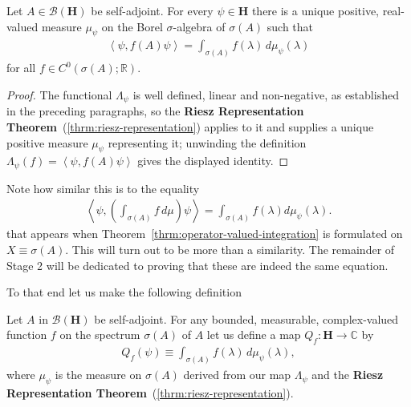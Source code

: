 \begin{proposition}
    \label{prpstn:associated-measures-self-adjoint}
    \leanok
    Let $A \in \mathcal{B}(\mathbf{H})$ be self-adjoint. For every $\psi \in \mathbf{H}$ there is a unique positive, real-valued measure $\mu_\psi$ on the Borel $\sigma$-algebra of $\sigma(A)$ such that
    \begin{align}
        \left< \psi, f(A) \psi \right> = \int_{\sigma(A)} f(\lambda) \, d\mu_\psi(\lambda)
    \end{align}
    for all $f \in C^0(\sigma(A) ; \mathbb{R})$.
\end{proposition}
\begin{proof}
    \leanok
The functional $\Lambda_\psi$ is well defined, linear and non-negative, as established in the preceding paragraphs, so the \textbf{Riesz Representation Theorem}~(\ref{thrm:riesz-representation}) applies to it and supplies a unique positive measure $\mu_\psi$ representing it; unwinding the definition $\Lambda_\psi(f) = \left< \psi, f(A)\psi \right>$ gives the displayed identity.
\end{proof}

Note how similar this is to the equality
\begin{align}
    \left< \psi, \left( \int_{\sigma(A)} f \, d\mu \right) \psi \right> = \int_{\sigma(A)} f(\lambda) d\mu_\psi(\lambda).
\end{align}
that appears when Theorem~\ref{thrm:operator-valued-integration} is formulated on $X \equiv \sigma(A)$. This will turn out to be more than a similarity. The remainder of Stage 2 will be dedicated to proving that these are indeed the same equation.  

To that end let us make the following definition

\begin{definition}
    \label{def:hall-8.6}
    \leanok
    Let $A$ in $\mathcal{B}(\mathbf{H})$ be self-adjoint. For any bounded, measurable, complex-valued function $f$ on the spectrum $\sigma(A)$ of $A$ let us define a map $Q_f : \mathbf{H} \rightarrow \mathbb{C}$ by
    \begin{align}
        Q_f(\psi) \equiv \int_{\sigma(A)} f(\lambda) \, d\mu_\psi(\lambda),
    \end{align}
    where $\mu_\psi$ is the measure on $\sigma(A)$ derived from our map $\Lambda_\psi$ and the \textbf{Riesz Representation Theorem}~(\ref{thrm:riesz-representation}).
\end{definition}

